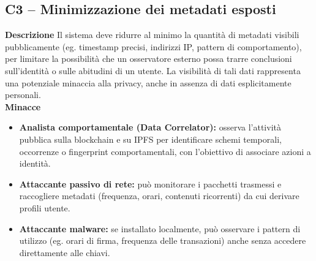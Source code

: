         \subsection{C3 – Minimizzazione dei metadati esposti}
            \noindent \textbf{Descrizione}
                Il sistema deve ridurre al minimo la quantità di metadati visibili pubblicamente (eg. timestamp precisi, indirizzi IP, pattern di comportamento), per limitare la possibilità che un osservatore esterno possa trarre conclusioni sull'identità o sulle abitudini di un utente. La visibilità di tali dati rappresenta una potenziale minaccia alla privacy, anche in assenza di dati esplicitamente personali. \\
    
            \noindent \textbf{Minacce}
                \begin{itemize}
                    \item \textbf{Analista comportamentale (Data Correlator):} osserva l'attività pubblica sulla blockchain e su IPFS per identificare schemi temporali, occorrenze o fingerprint comportamentali, con l'obiettivo di associare azioni a identità.
    
                    \item \textbf{Attaccante passivo di rete:} può monitorare i pacchetti trasmessi e raccogliere metadati (frequenza, orari, contenuti ricorrenti) da cui derivare profili utente.
    
                    \item \textbf{Attaccante malware:} se installato localmente, può osservare i pattern di utilizzo (eg. orari di firma, frequenza delle transazioni) anche senza accedere direttamente alle chiavi.
                \end{itemize}
    
